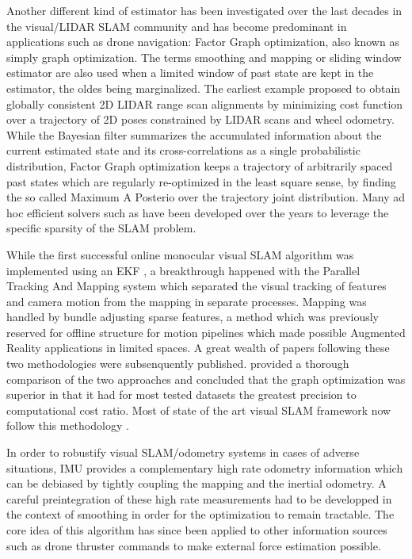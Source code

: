Another different kind of estimator has been investigated over the last decades in the visual/LIDAR SLAM community and has become predominant in applications
such as drone navigation: Factor Graph optimization, also known as simply graph optimization. The terms smoothing and mapping or sliding window estimator are
also used when a limited window of past state are kept in the estimator, the oldes being marginalized. The earliest example \cite{lu1997globally} 
proposed to obtain globally consistent 2D LIDAR range scan alignments by minimizing cost function over a trajectory of 2D poses constrained by LIDAR scans and wheel odometry.
While the Bayesian filter summarizes the accumulated information about the current estimated state and its cross-correlations as a single probabilistic distribution, 
Factor Graph optimization keeps a trajectory of arbitrarily spaced past states which are regularly re-optimized in the least square sense, by finding the so called 
Maximum A Posterio over the trajectory joint distribution. Many ad hoc efficient solvers such as\cite{grisetti2011g2o, dellaert2012factor, ila2017slam++, ceres-solver} have been developed 
over the years to leverage the specific sparsity of the SLAM problem.

While the first successful online monocular visual SLAM algorithm was implemented using an EKF \cite{davison2007monoslam}, a breakthrough happened with the 
Parallel Tracking And Mapping system \cite{klein2009parallel} which separated the visual tracking of features and camera motion from the 
mapping in separate processes. Mapping was handled by bundle adjusting sparse features, a method which was previously reserved for offline 
structure for motion pipelines \cite{triggs1999bundle} which made possible Augmented Reality applications in limited spaces. 
A great wealth of papers following these two methodologies were subsenquently published. \cite{strasdat2012visual} provided a thorough comparison 
of the two approaches and concluded that the graph optimization was superior in that it had for most tested datasets the greatest precision to 
computational cost ratio. Most of state of the art visual SLAM framework now follow this methodology \cite{forster2017-TRO, mur2015orb, qin2018vins, leutenegger2015keyframe, ferrera2021ov}.

In order to robustify visual SLAM/odometry systems in cases of adverse situations, IMU provides a complementary high rate odometry information which can 
be debiased by tightly coupling the mapping and the inertial odometry. A careful preintegration \cite{lupton-09,forster2017-TRO} of these high 
rate measurements had to be developped in the context of smoothing in order for the optimization to remain tractable. The core idea of this algorithm has 
since been applied to other information sources such as drone thruster commands \cite{nisar2019vimo} to make external force estimation possible.

